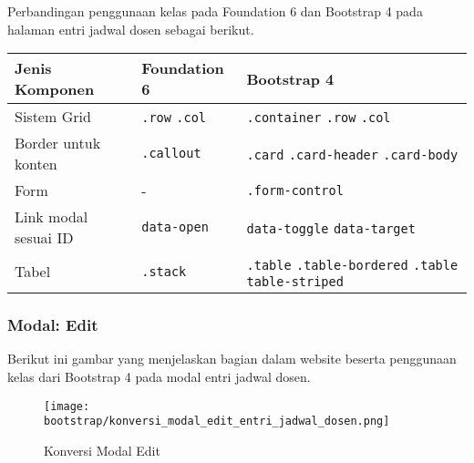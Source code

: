 \noindent Perbandingan penggunaan kelas pada Foundation 6 dan Bootstrap 4 pada halaman entri jadwal dosen sebagai berikut.\\
\begin{tabular}{| p{} | p{} | p{} |} 
	\hline
	\textbf{Jenis Komponen} & \textbf{Foundation 6} & \textbf{Bootstrap 4}  \\ [0.5ex] 
	\hline	
	Sistem Grid & \newline \texttt{.row} \newline \texttt{.col} &   \texttt{.container} \newline \texttt{.row} \newline \texttt{.col} \\ 
	\hline	
	Border untuk konten & \texttt{.callout} &  \texttt{.card} \newline \texttt{.card-header} \newline \texttt{.card-body} \\
	\hline
	Form & - & \texttt{.form-control} \\	
	\hline		
	Link modal sesuai ID & \texttt{data-open} & \texttt{data-toggle} \newline \texttt{data-target}\\
	\hline	
	Tabel & \texttt{.stack} & \texttt{.table} \newline \texttt{.table-bordered} \newline \texttt{.table table-striped}  \\[1ex]
	\hline	
\end{tabular}

\subsubsection{Modal: Edit}
\noindent Berikut ini gambar yang menjelaskan bagian dalam website beserta penggunaan kelas dari Bootstrap 4 pada modal entri jadwal dosen.\\
\begin{figure} [H]
	\centering  
	\texttt{[image: bootstrap/konversi\_modal\_edit\_entri\_jadwal\_dosen.png]}
	\caption{Konversi Modal Edit}
\end{figure}

